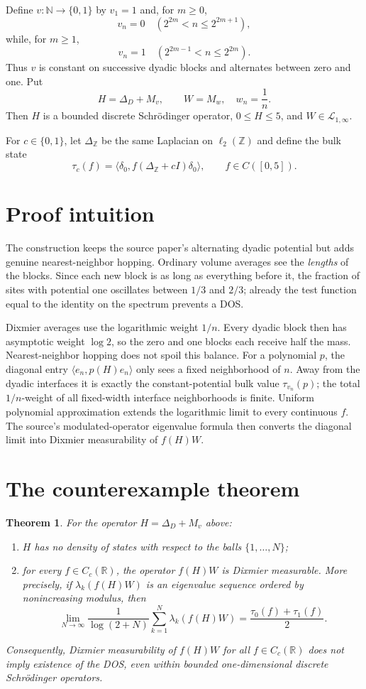 \documentclass[11pt]{article}
\newtheorem{theorem}{Theorem}
\newcommand{\N}{\mathbb N}
\newcommand{\R}{\mathbb R}
\newcommand{\ip}[2]{\langle #1,#2\rangle}
\begin{document}
Define $v:\N\to\{0,1\}$ by $v_1=1$ and, for $m\geq0$,
\[
 v_n=0\quad(2^{2m}<n\leq 2^{2m+1}),
\]
while, for $m\geq1$,
\[
 v_n=1\quad(2^{2m-1}<n\leq 2^{2m}).
\]
Thus $v$ is constant on successive dyadic blocks and alternates between zero
and one.  Put
\[
 H=\Delta_D+M_v,
 \qquad
 W=M_w,\quad w_n=\frac1n.
\]
Then $H$ is a bounded discrete Schr\"odinger operator, $0\leq H\leq5$, and
$W\in\mathcal L_{1,\infty}$.

For $c\in\{0,1\}$, let $\Delta_{\mathbb Z}$ be the same Laplacian on
$\ell_2(\mathbb Z)$ and define the bulk state
\[
 \tau_c(f)=\ip{\delta_0}{f(\Delta_{\mathbb Z}+cI)\delta_0},
 \qquad f\in C([0,5]).
\]

\section{Proof intuition}

The construction keeps the source paper's alternating dyadic potential but
adds genuine nearest-neighbor hopping.  Ordinary volume averages see the
\emph{lengths} of the blocks.  Since each new block is as long as everything
before it, the fraction of sites with potential one oscillates between
$1/3$ and $2/3$; already the test function equal to the identity on the
spectrum prevents a DOS.

Dixmier averages use the logarithmic weight $1/n$.  Every dyadic block then
has asymptotic weight $\log 2$, so the zero and one blocks each receive half
the mass.  Nearest-neighbor hopping does not spoil this balance.  For a
polynomial $p$, the diagonal entry $\ip{e_n}{p(H)e_n}$ only sees a fixed
neighborhood of $n$.  Away from the dyadic interfaces it is exactly the
constant-potential bulk value $\tau_{v_n}(p)$; the total $1/n$-weight of all
fixed-width interface neighborhoods is finite.  Uniform polynomial
approximation extends the logarithmic limit to every continuous $f$.  The
source's modulated-operator eigenvalue formula then converts the diagonal
limit into Dixmier measurability of $f(H)W$.

\section{The counterexample theorem}

\begin{theorem}\label{thm:main}
For the operator $H=\Delta_D+M_v$ above:
\begin{enumerate}[label=\textup{(\roman*)}]
\item $H$ has no density of states with respect to the balls
      $\{1,\ldots,N\}$;
\item for every $f\in C_c(\R)$, the operator $f(H)W$ is Dixmier measurable.
      More precisely, if $\lambda_k(f(H)W)$ is an eigenvalue sequence ordered
      by nonincreasing modulus, then
\[
 \lim_{N\to\infty}\frac1{\log(2+N)}
 \sum_{k=1}^N\lambda_k(f(H)W)
 =\frac{\tau_0(f)+\tau_1(f)}2.
\]
\end{enumerate}
Consequently, Dixmier measurability of $f(H)W$ for all $f\in C_c(\R)$ does
not imply existence of the DOS, even within bounded one-dimensional discrete
Schr\"odinger operators.
\end{theorem}
\end{document}
